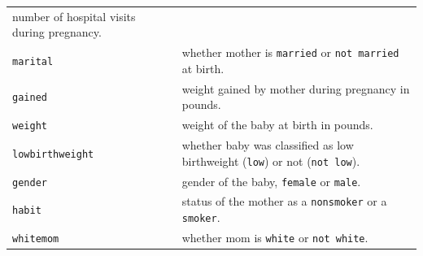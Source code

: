 \documentclass[]{book}
\theoremstyle{definition}
\theoremstyle{definition}
\theoremstyle{definition}
\theoremstyle{remark}
\begin{document}
\begin{longtable}[]{@{}ll@{}}
\begin{minipage}[t]{0.16\columnwidth}
number of hospital visits during pregnancy.\strut
\end{minipage}\tabularnewline
\begin{minipage}[t]{0.22\columnwidth}\raggedright\strut
\texttt{marital}\strut
\end{minipage} & \begin{minipage}[t]{0.16\columnwidth}\raggedright\strut
whether mother is \texttt{married} or \texttt{not\ married} at
birth.\strut
\end{minipage}\tabularnewline
\begin{minipage}[t]{0.22\columnwidth}\raggedright\strut
\texttt{gained}\strut
\end{minipage} & \begin{minipage}[t]{0.16\columnwidth}\raggedright\strut
weight gained by mother during pregnancy in pounds.\strut
\end{minipage}\tabularnewline
\begin{minipage}[t]{0.22\columnwidth}\raggedright\strut
\texttt{weight}\strut
\end{minipage} & \begin{minipage}[t]{0.16\columnwidth}\raggedright\strut
weight of the baby at birth in pounds.\strut
\end{minipage}\tabularnewline
\begin{minipage}[t]{0.22\columnwidth}\raggedright\strut
\texttt{lowbirthweight}\strut
\end{minipage} & \begin{minipage}[t]{0.16\columnwidth}\raggedright\strut
whether baby was classified as low birthweight (\texttt{low}) or not
(\texttt{not\ low}).\strut
\end{minipage}\tabularnewline
\begin{minipage}[t]{0.22\columnwidth}\raggedright\strut
\texttt{gender}\strut
\end{minipage} & \begin{minipage}[t]{0.16\columnwidth}\raggedright\strut
gender of the baby, \texttt{female} or \texttt{male}.\strut
\end{minipage}\tabularnewline
\begin{minipage}[t]{0.22\columnwidth}\raggedright\strut
\texttt{habit}\strut
\end{minipage} & \begin{minipage}[t]{0.16\columnwidth}\raggedright\strut
status of the mother as a \texttt{nonsmoker} or a \texttt{smoker}.\strut
\end{minipage}\tabularnewline
\begin{minipage}[t]{0.22\columnwidth}\raggedright\strut
\texttt{whitemom}\strut
\end{minipage} & \begin{minipage}[t]{0.16\columnwidth}\raggedright\strut
whether mom is \texttt{white} or \texttt{not\ white}.\strut
\end{minipage}\tabularnewline
\bottomrule
\end{longtable}
\end{document}
